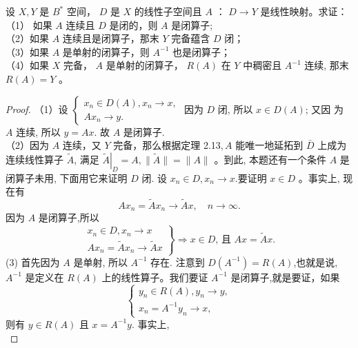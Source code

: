 \documentclass[lang=cn,newtx,10pt,scheme=chinese,thmcnt=chapter]{elegantbook}
\begin{document}
\begin{problem}
设 ${X} ,{ Y}$ 是 $B^*$ 空间， $D$ 是 ${X}$ 的线性子空间且 $A$ ： $D \rightarrow {Y}$ 是线性映射。求证：\\
（1） 如果 $A$ 连续且 $D$ 是闭的，则 $A$ 是闭算子;\\
（2）如果 $A$ 连续且是闭算子，那末 ${Y}$ 完备蕴含 $D$ 闭；\\
（3）如果 $A$ 是单射的闭算子，则 $A^{-1}$ 也是闭算子；\\
（4）如果 ${X}$ 完备， $A$ 是单射的闭算子， $R(A)$ 在 ${Y}$ 中稠密且 $A^{-1}$ 连续, 那末 $R(A)= {Y}$ 。
\end{problem}
\begin{proof}
（1）设 $\left\{\begin{array}{l}x_n \in D(A), x_n \rightarrow x, \\ A x_n \rightarrow y .\end{array}\right.$ 因为 $D$ 闭, 所以 $x \in D(A)$; 又因
为 $A$ 连续, 所以 $y=A x$. 故 $A$ 是闭算子.\\
（2）因为 $A$ 连续，又 $ Y$ 完备，那么根据定理 2.13$, A$ 能唯一地延拓到 $\bar{D}$ 上成为连续线性算子 $\widetilde{A}$, 满足 $\left.\widetilde{A}\right|_D=A,\|\widetilde{A}\|=\|A\|$ 。到此, 本题还有一个条件 $A$ 是闭算子未用, 下面用它来证明 $D$ 闭. 设 $x_n \in D, x_n \rightarrow x$.要证明 $x \in D$ 。事实上, 现在有
\begin{equation*}
A x_n=\widetilde{A} x_n \rightarrow \widetilde{A} x, \quad n \rightarrow \infty .
\end{equation*}
因为 $A$ 是闭算子,所以
\begin{equation*}
\left.\begin{array}{l}
x_n \in D, x_n \rightarrow x \\
A x_n=\widetilde{A} x_n \rightarrow \widetilde{A} x
\end{array}\right\} \Rightarrow x \in D \text {, 且 } {A} x=\widetilde{A} x .
\end{equation*}
(3) 首先因为 $A$ 是单射, 所以 $A^{-1}$ 存在. 注意到 $D\left(A^{-1}\right)=R(A)$,也就是说, $A^{-1}$ 是定义在 $R(A)$ 上的线性算子。我们要证 $A^{-1}$ 是闭算子,就是要证，如果
\begin{equation*}
\left\{\begin{array}{l}
y_n \in R(A), y_n \rightarrow y, \\
x_n=A^{-1} y_n \rightarrow x,
\end{array}\right.
\end{equation*}
则有 $y \in R(A)$ 且 $x=A^{-1} y$. 事实上,
\begin{equation*}

\end{equation*}
\end{proof}
\end{document}

